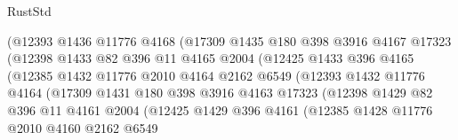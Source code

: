 \begin{lexlean}{RustStd}
\begin{coremodule}
                            (@12393
                              @1436
                              @11776
                              @4168
                              (@17309
                                @1435
                                @180
                                @398
                                @3916
                                @4167
                                @17323
                                (@12398
                                  @1433
                                  @82
                                  @396
                                  @11
                                  @4165
                                  @2004
                                  (@12425
                                    @1433
                                    @396
                                    @4165
                                    (@12385
                                      @1432
                                      @11776
                                      @2010
                                      @4164
                                      @2162
                                      @6549
                                      (@12393
                                        @1432
                                        @11776
                                        @4164
                                        (@17309
                                          @1431
                                          @180
                                          @398
                                          @3916
                                          @4163
                                          @17323
                                          (@12398
                                            @1429
                                            @82
                                            @396
                                            @11
                                            @4161
                                            @2004
                                            (@12425
                                              @1429
                                              @396
                                              @4161
                                              (@12385
                                                @1428
                                                @11776
                                                @2010
                                                @4160
                                                @2162
                                                @6549

\end{coremodule}
\end{lexlean}
